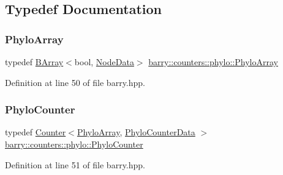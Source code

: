 \subsection{Typedef Documentation}
\mbox{\label{namespacebarry_1_1counters_1_1phylo_a50a6652c16ff57d76b4099043d6a0bbb}} 
\subsubsection{\texorpdfstring{Phylo\+Array}{PhyloArray}}
{\footnotesize\ttfamily typedef \hyperlink{classbarry_1_1_b_array}{B\+Array}$<$bool, \hyperlink{classbarry_1_1counters_1_1phylo_1_1_node_data}{Node\+Data}$>$ \hyperlink{namespacebarry_1_1counters_1_1phylo_a50a6652c16ff57d76b4099043d6a0bbb}{barry\+::counters\+::phylo\+::\+Phylo\+Array}}



Definition at line 50 of file barry.\+hpp.

\mbox{\label{namespacebarry_1_1counters_1_1phylo_a6523924ce3465c5b212584c57664f953}} 
\subsubsection{\texorpdfstring{Phylo\+Counter}{PhyloCounter}}
{\footnotesize\ttfamily typedef \hyperlink{classbarry_1_1_counter}{Counter}$<$\hyperlink{namespacebarry_1_1counters_1_1phylo_a50a6652c16ff57d76b4099043d6a0bbb}{Phylo\+Array}, \hyperlink{namespacebarry_1_1counters_1_1phylo_a6ecc0d8ab76f8dc2db152221a8e9e95a}{Phylo\+Counter\+Data} $>$ \hyperlink{namespacebarry_1_1counters_1_1phylo_a6523924ce3465c5b212584c57664f953}{barry\+::counters\+::phylo\+::\+Phylo\+Counter}}



Definition at line 51 of file barry.\+hpp.

\mbox{\label{namespacebarry_1_1counters_1_1phylo_a6ecc0d8ab76f8dc2db152221a8e9e95a}} 
